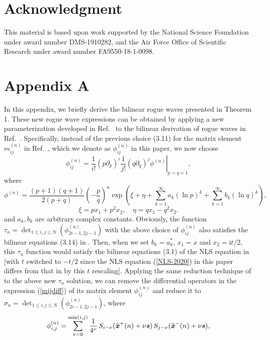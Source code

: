 \documentclass[amsmath,amssymb]{revtex4}
\def\[{\begin{equation}}
\def\]{\end{equation}}
\begin{document}
\section*{Acknowledgment}
This material is based upon work supported by the National Science Foundation under award number DMS-1910282, and the Air Force Office of Scientific Research under award number FA9550-18-1-0098.

\section*{Appendix A}
In this appendix, we briefly derive the bilinear rogue waves presented in Theorem 1. These new rogue wave expressions can be obtained by applying a new parameterization developed in Ref.~\cite{YangDNLS2019} to the bilinear derivation of rogue waves in Ref.~\cite{OhtaJY2012}. Specifically, instead of the previous choice (3.11) for the matrix element $m_{ij}^{(n)}$ in Ref.~\cite{OhtaJY2012}, which we denote as $\phi_{ij}^{(n)}$ in this paper, we now choose
\[ \label{mijdiff}
\phi_{ij}^{(n)}=\left. \frac{1}{i!}(p\partial_p)^i \frac{1}{j!}(q\partial_q)^j \phi^{(n)}\right|_{p=q=1},
\]
where
\[
\phi^{(n)}=\frac{(p+1)(q+1)}{2(p+q)}\left(-\frac{p}{q}\right)^n \exp\left(\xi+\eta+\sum_{k=1}^\infty a_k (\ln p)^k +\sum_{k=1}^\infty b_k (\ln q)^k\right),
\]
\[
\xi=px_1+p^2x_2, \quad \eta=qx_1-q^2x_2.
\]
and $a_k, b_k$ are arbitrary complex constants. Obviously, the function $\tau_n=\det_{1\le i,j\le N}\left(\phi_{2i-1,2j-1}^{(n)}\right)$ with the above choice of $\phi_{ij}^{(n)}$ also satisfies the bilinear equations (3.14) in \cite{OhtaJY2012}. Then, when we set $b_k=a_k^*$, $x_1=x$ and $x_2=\textrm{i}t/2$, this $\tau_n$ function would satisfy the bilinear equations (3.1) of the NLS equation in \cite{OhtaJY2012} [with $t$ switched to $-t/2$ since the NLS equation (\ref{NLS-2020}) in this paper differs from that in \cite{OhtaJY2012} by this $t$ rescaling]. Applying the same reduction technique of \cite{OhtaJY2012} to the above new $\tau_n$ solution, we can remove the differential operators in the expression (\ref{mijdiff}) of its matrix element $\phi_{ij}^{(n)}$ and reduce it to $\sigma_n=\det_{1\le i,j\le N}\left(\phi_{2i-1,2j-1}^{(n)}\right)$, where
\begin{equation}
\phi_{i,j}^{(n)}=\sum_{\nu=0}^{\min(i,j)} \frac{1}{4^{\nu}} \hspace{0.06cm} S_{i-\nu}(\hat{\textbf{\emph{x}}}^{+}(n) +\nu \textbf{\emph{s}})  \hspace{0.06cm} S_{j-\nu}(\hat{\textbf{\emph{x}}}^{-}(n) + \nu \textbf{\emph{s}}),
\end{equation}
\end{document}
